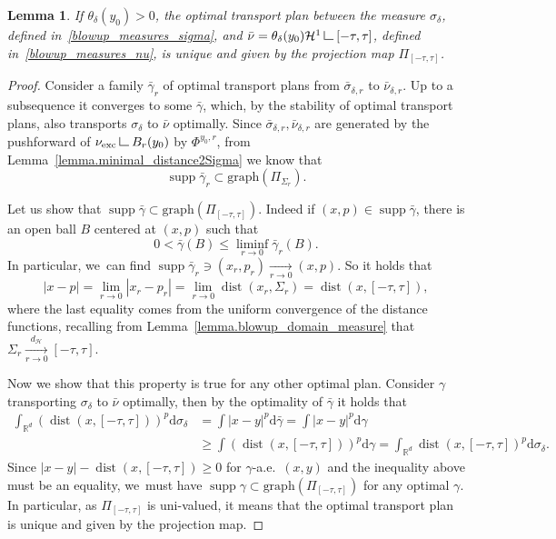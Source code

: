 \documentclass[JEP,XML,SOM,Unicode,NoFloatCountersInSection,published]{cedram}
\newtheorem{lemma}[theorem]{Lemma}
\theoremstyle{definition}
\newcommand\LM[1]{\hbox{\vrule width.5pt \vbox to#1pt{\vfill \hrule width#1pt height.5pt}}}
\newcommand\LL{{\mathchoice {\>\LM7\>}{\>\LM7\>}{\,\LM5\,}{\,\LM{3.35}\,}}}
\newcommand{\mres}{\LL}
\newcommand\cH{\mathcal{H}}
\newcommand{\RR}{\mathbb{R}}
\DeclareMathOperator{\dist}{dist}
\DeclareMathOperator{\supp}{supp}
\newcommand{\distH}{d_{\mathcal{H}}}
\newcommand{\nuexc}{\nu_{\textup{exc}}}
\newcommand\dd{\mathrm{d}}
\begin{document}
\begin{lemma}\label{lemma.brenier_map_blowup_family}
If $\theta_\delta(y_0)>0$, the optimal transport plan between the measure $\sigma_{\delta}$, defined in~\eqref{blowup_measures_sigma}, and $\bar \nu = \theta_\delta(y_0)\cH^1\mres [-\tau, \tau]$, defined in~\eqref{blowup_measures_nu}, is unique and given by the projection map $\Pi_{[-\tau, \tau]}$.
\end{lemma}

\begin{proof}
Consider a family $\bar \gamma_r$ of optimal transport plans from $\bar \sigma_{\delta , r}$ to $\bar \nu_{\delta ,r}$. Up to a subsequence it converges to some $\bar \gamma$, which, by the stability of optimal transport plans, also transports $\sigma_{\delta}$ to $\bar \nu$ optimally. Since $\bar \sigma_{\delta , r}, \bar \nu_{\delta ,r}$ are generated by the pushforward of $\nuexc\mres B_r(y_0)$ by $\Phi^{y_0, r}$, from Lemma~\ref{lemma.minimal_distance2Sigma} we know that
\[
\supp \bar \gamma_r \subset \text{graph}(\Pi_{\Sigma_r}).
\]

Let us show that $\supp \bar \gamma \subset \text{graph}\left(\Pi_{[-\tau, \tau]}\right)$. Indeed if $(x,p) \in \supp \bar \gamma$, there is an open ball $B$ centered at $(x,p)$ such that
\[
0 < \bar \gamma(B) \le \liminf_{r \to 0} \bar\gamma_r(B).
\]
In particular, we~can find $\supp \bar \gamma_r \ni (x_r, p_r) \xrightarrow[r \to 0]{} (x,p)$. So it holds that
\[
|x - p|
=
\lim_{r \to 0}
|x_r - p_r|
=
\lim_{r \to 0}
\dist\left(x_r, \Sigma_r\right)
=
\dist(x, [-\tau, \tau]),
\]
where the last equality comes from the uniform convergence of the distance functions, recalling from Lemma~\ref{lemma.blowup_domain_measure} that $\Sigma_r \xrightarrow[r \to 0]{\distH} [-\tau, \tau]$.

Now we show that this property is true for any other optimal plan. Consider $\gamma$ transporting $\sigma_{\delta}$ to $\bar \nu$ optimally, then by the optimality of $\bar \gamma$ it holds that
\begin{align*}
\int_{\RR^d} (\dist(x, [-\tau, \tau]))^p\dd \sigma_{\delta}
&=
\int |x - y|^p\dd \bar\gamma
= \int |x - y|^p\dd \gamma\\
&\ge
\int (\dist(x, [-\tau, \tau]))^p \dd \gamma
=
\int_{\RR^d} \dist(x, [-\tau, \tau])^p\dd \sigma_{\delta}.
\end{align*}
Since $|x - y| - \dist(x,[-\tau, \tau]) \ge 0 $ for $\gamma$-a.e.\ $(x,y)$ and the inequality above must be an equality, we~must have $\supp \gamma \subset \text{graph}\left(\Pi_{[-\tau, \tau]}\right)$ for any optimal $\gamma$. In particular, as $\Pi_{[-\tau, \tau]}$ is uni-valued, it means that the optimal transport plan is unique and given by the projection map.
\end{proof}
\end{document}
